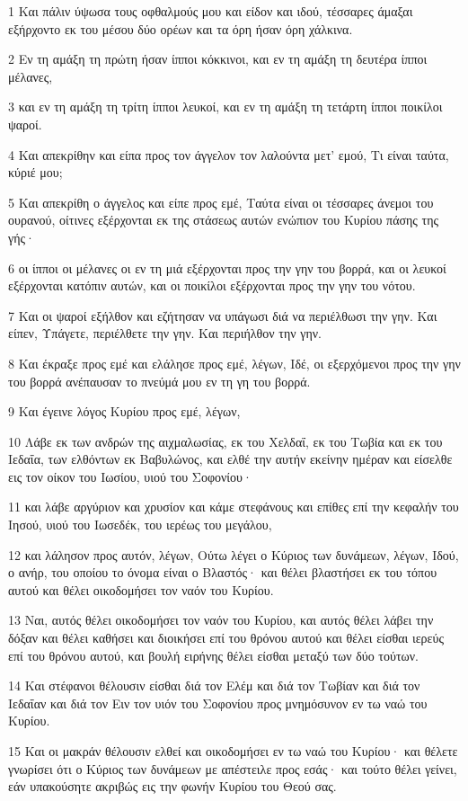 \par 1 Και πάλιν ύψωσα τους οφθαλμούς μου και είδον και ιδού, τέσσαρες άμαξαι εξήρχοντο εκ του μέσου δύο ορέων και τα όρη ήσαν όρη χάλκινα.
\par 2 Εν τη αμάξη τη πρώτη ήσαν ίπποι κόκκινοι, και εν τη αμάξη τη δευτέρα ίπποι μέλανες,
\par 3 και εν τη αμάξη τη τρίτη ίπποι λευκοί, και εν τη αμάξη τη τετάρτη ίπποι ποικίλοι ψαροί.
\par 4 Και απεκρίθην και είπα προς τον άγγελον τον λαλούντα μετ' εμού, Τι είναι ταύτα, κύριέ μου;
\par 5 Και απεκρίθη ο άγγελος και είπε προς εμέ, Ταύτα είναι οι τέσσαρες άνεμοι του ουρανού, οίτινες εξέρχονται εκ της στάσεως αυτών ενώπιον του Κυρίου πάσης της γής·
\par 6 οι ίπποι οι μέλανες οι εν τη μιά εξέρχονται προς την γην του βορρά, και οι λευκοί εξέρχονται κατόπιν αυτών, και οι ποικίλοι εξέρχονται προς την γην του νότου.
\par 7 Και οι ψαροί εξήλθον και εζήτησαν να υπάγωσι διά να περιέλθωσι την γην. Και είπεν, Υπάγετε, περιέλθετε την γην. Και περιήλθον την γην.
\par 8 Και έκραξε προς εμέ και ελάλησε προς εμέ, λέγων, Ιδέ, οι εξερχόμενοι προς την γην του βορρά ανέπαυσαν το πνεύμά μου εν τη γη του βορρά.
\par 9 Και έγεινε λόγος Κυρίου προς εμέ, λέγων,
\par 10 Λάβε εκ των ανδρών της αιχμαλωσίας, εκ του Χελδαΐ, εκ του Τωβία και εκ του Ιεδαΐα, των ελθόντων εκ Βαβυλώνος, και ελθέ την αυτήν εκείνην ημέραν και είσελθε εις τον οίκον του Ιωσίου, υιού του Σοφονίου·
\par 11 και λάβε αργύριον και χρυσίον και κάμε στεφάνους και επίθες επί την κεφαλήν του Ιησού, υιού του Ιωσεδέκ, του ιερέως του μεγάλου,
\par 12 και λάλησον προς αυτόν, λέγων, Ούτω λέγει ο Κύριος των δυνάμεων, λέγων, Ιδού, ο ανήρ, του οποίου το όνομα είναι ο Βλαστός· και θέλει βλαστήσει εκ του τόπου αυτού και θέλει οικοδομήσει τον ναόν του Κυρίου.
\par 13 Ναι, αυτός θέλει οικοδομήσει τον ναόν του Κυρίου, και αυτός θέλει λάβει την δόξαν και θέλει καθήσει και διοικήσει επί του θρόνου αυτού και θέλει είσθαι ιερεύς επί του θρόνου αυτού, και βουλή ειρήνης θέλει είσθαι μεταξύ των δύο τούτων.
\par 14 Και στέφανοι θέλουσιν είσθαι διά τον Ελέμ και διά τον Τωβίαν και διά τον Ιεδαΐαν και διά τον Ειν τον υιόν του Σοφονίου προς μνημόσυνον εν τω ναώ του Κυρίου.
\par 15 Και οι μακράν θέλουσιν ελθεί και οικοδομήσει εν τω ναώ του Κυρίου· και θέλετε γνωρίσει ότι ο Κύριος των δυνάμεων με απέστειλε προς εσάς· και τούτο θέλει γείνει, εάν υπακούσητε ακριβώς εις την φωνήν Κυρίου του Θεού σας.

